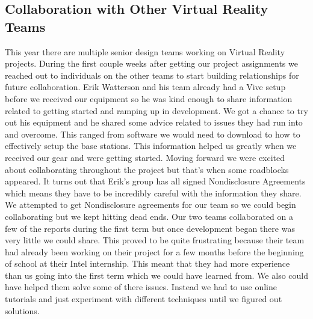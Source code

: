 \documentclass[10pt,journal,compsoc,onecolumn, draftclsnofoot]{IEEEtran}
\begin{document}
\subsection{Collaboration with Other Virtual Reality Teams}
This year there are multiple senior design teams working on Virtual Reality projects.
During the first couple weeks after getting our project assignments we reached out to individuals on the other teams to start building relationships for future collaboration.
Erik Watterson and his team already had a Vive setup before we received our equipment so he was kind enough to share information related to getting started and ramping up in development.
We got a chance to try out his equipment and he shared some advice related to issues they had run into and overcome.
This ranged from software we would need to download to how to effectively setup the base stations.
This information helped us greatly when we received our gear and were getting started.
Moving forward we were excited about collaborating throughout the project but that’s when some roadblocks appeared.
It turns out that Erik’s group has all signed Nondisclosure Agreements which means they have to be incredibly careful with the information they share.
We attempted to get Nondisclosure agreements for our team so we could begin collaborating but we kept hitting dead ends.
Our two teams collaborated on a few of the reports during the first term but once development began there was very little we could share.
This proved to be quite frustrating because their team had already been working on their project for a few months before the beginning of school at their Intel internship.
This meant that they had more experience than us going into the first term which we could have learned from.
We also could have helped them solve some of there issues.
Instead we had to use online tutorials and just experiment with different techniques until we figured out solutions.
\end{document}
